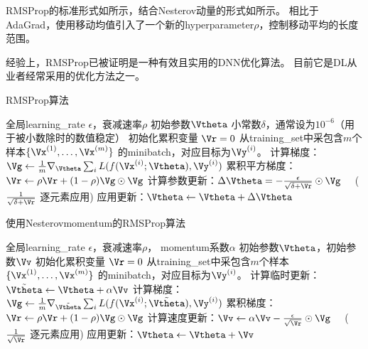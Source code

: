 
RMSProp的标准形式如所示，结合Nesterov动量的形式如所示。
相比于AdaGrad，使用移动均值引入了一个新的\gls{hyperparameter}$\rho$，控制移动平均的长度范围。


经验上，RMSProp已被证明是一种有效且实用的\gls{DNN}优化算法。
目前它是\gls{DL}从业者经常采用的优化方法之一。


\begin{algorithm}[ht]
\caption{RMSProp算法}
\label{alg:rms_prop}
\begin{algorithmic}
\REQUIRE 全局\gls{learning_rate} $\epsilon$，衰减速率$\rho$
\REQUIRE  初始参数$\Vtheta$
\REQUIRE 小常数$\delta$，通常设为$10^{-6}$（用于被小数除时的数值稳定）
\STATE 初始化累积变量 $\Vr = 0$
    \STATE 从\gls{training_set}中采包含$m$个样本$\{ \Vx^{(1)},\dots, \Vx^{(m)}\}$ 的\gls{minibatch}，对应目标为$\Vy^{(i)}$。
    \STATE 计算梯度：$\Vg \leftarrow  
         \frac{1}{m} \nabla_{\Vtheta} \sum_i L(f(\Vx^{(i)};\Vtheta),\Vy^{(i)})$ 
    \STATE 累积平方梯度：$\Vr \leftarrow \rho
    \Vr + (1-\rho) \Vg \odot \Vg$
    \STATE 计算参数更新：$\Delta \Vtheta =
    -\frac{\epsilon}{\sqrt{\delta + \Vr}} \odot \Vg$  \ \  ($\frac{1}{\sqrt{\delta + \Vr}}$ 逐元素应用)
    \STATE 应用更新：$\Vtheta \leftarrow \Vtheta + \Delta \Vtheta$
\ENDWHILE
\end{algorithmic}
\end{algorithm}

\begin{algorithm}[ht]
\caption{使用Nesterov\gls{momentum}的RMSProp算法}
\label{alg:rms_nesterov}
\begin{algorithmic}
\REQUIRE 全局\gls{learning_rate} $\epsilon$，衰减速率$\rho$， \gls{momentum}系数$\alpha$
\REQUIRE 初始参数$\Vtheta$，初始参数$\Vv$
\STATE 初始化累积变量 $\Vr = 0$
    \STATE 从\gls{training_set}中采包含$m$个样本$\{ \Vx^{(1)},\dots, \Vx^{(m)}\}$ 的\gls{minibatch}，对应目标为$\Vy^{(i)}$。
    \STATE 计算临时更新：$\tilde{\Vtheta} \leftarrow \Vtheta + \alpha \Vv$
    \STATE 计算梯度：$\Vg \leftarrow  
         \frac{1}{m} \nabla_{\tilde{\Vtheta}} \sum_i L(f(\Vx^{(i)};\tilde{\Vtheta}),\Vy^{(i)})$ 
    \STATE  累积梯度：$\Vr \leftarrow \rho
    \Vr + (1-\rho) \Vg \odot \Vg$
    \STATE  计算速度更新：$\Vv \leftarrow \alpha \Vv
    -\frac{\epsilon}{\sqrt{\Vr}} \odot \Vg$ \ \  ($\frac{1}{\sqrt{\Vr}}$ 逐元素应用)
    \STATE 应用更新：$\Vtheta \leftarrow \Vtheta + \Vv$
\ENDWHILE
\end{algorithmic}
\end{algorithm}


